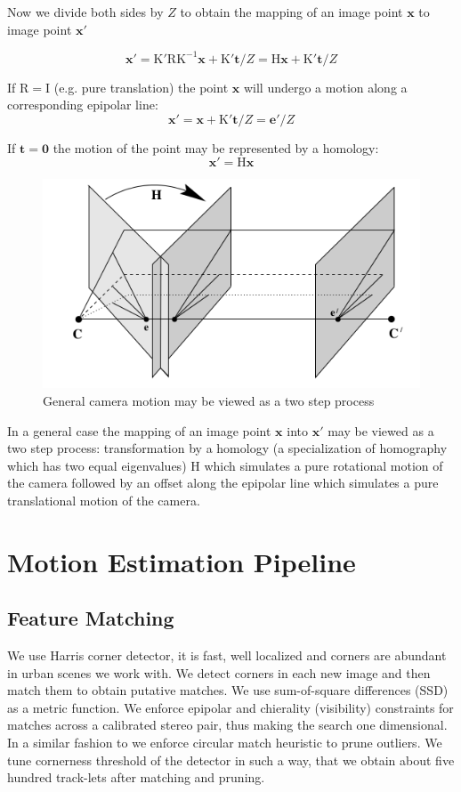 \documentclass[runningheads]{llncs}
\begin{document}
Now we divide both sides by $Z$ to obtain the mapping of an image point $\mathbf{x}$ to image point $\mathbf{x}'$

\begin{equation}
  \label{eq:point_motion}
  \mathbf{x}' = \mathrm{K'RK^{-1}}\mathbf{x} + \mathrm{K'}\mathbf{t}/Z = \mathrm{H}\mathbf{x}+ \mathrm{K'}\mathbf{t}/Z
\end{equation}

If $\mathrm{R = I}$ (e.g. pure translation) the point $\mathbf{x}$ will undergo a motion along a corresponding epipolar line:
\[
\mathbf{x}' = \mathbf{x}+ \mathrm{K'}\mathbf{t}/Z = \mathbf{e}'/Z
\]

If $\mathbf{t} = \mathbf{0}$ the motion of the point may be represented by a homology:
\[
\mathbf{x}' = \mathrm{H}\mathbf{x}
\]

\begin{figure}[h]
\includegraphics[scale=.3]{general_camera_motion}
\centering
\caption{General camera motion may be viewed as a two step process}
\end{figure}

In a general case the mapping of an image point $\mathbf{x}$ into $\mathbf{x}'$ may be viewed as a two step process: transformation by a homology (a specialization of homography which has two equal eigenvalues) $\mathrm{H}$ which simulates a pure rotational motion of the camera followed by an offset along the epipolar line which simulates a pure translational motion of the camera.

\section{Motion Estimation Pipeline}

\subsection{Feature Matching}
We use Harris corner detector, it is fast, well localized and corners
are abundant in urban scenes we work with. We detect corners in each
new image and then match them to obtain putative matches. We use
sum-of-square differences (SSD) as a metric function.  We enforce
epipolar and chierality (visibility) constraints for matches across a
calibrated stereo pair, thus making the search one dimensional. In a
similar fashion to \cite{Geiger2011} we enforce circular match
heuristic to prune outliers.  We tune cornerness threshold of the
detector in such a way, that we obtain about five hundred track-lets
after matching and pruning.
\end{document}
